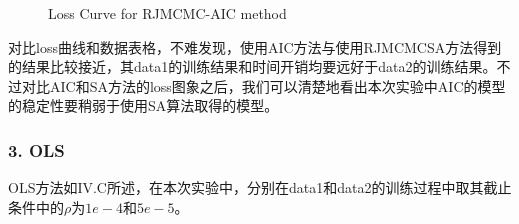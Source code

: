 \documentclass[twocolumn]{article}
\begin{document}
\begin{figure}[H]
  \centering
  \hspace{0in}
  \hspace{0in}
  \caption{Loss Curve for RJMCMC-AIC method}
\end{figure}

对比loss曲线和数据表格，不难发现，使用AIC方法与使用RJMCMCSA方法得到的结果比较接近，其data1的训练结果和时间开销均要远好于data2的训练结果。不过对比AIC和SA方法的loss图象之后，我们可以清楚地看出本次实验中AIC的模型的稳定性要稍弱于使用SA算法取得的模型。

\subsubsection*{3. OLS}

OLS方法如IV.C所述，在本次实验中，分别在data1和data2的训练过程中取其截止条件中的$\rho$为$1e-4$和$5e-5$。
\end{document}
